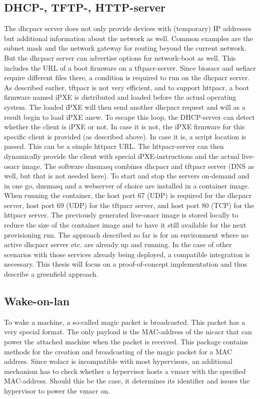 \subsection{DHCP-, TFTP-, HTTP-server}
The \gls{dhcpacr} server does not only provide devices with (temporary) IP addresses but additional information about the network as well. Common examples are the subnet mask and the network gateway for routing beyond the current network. But the \gls{dhcpacr} server can advertise options for network-boot as well. This includes the URL of a boot firmware on a \gls{tftpacr}-server. Since \gls{biosacr} and \gls{uefiacr} require different files there, a condition is required to run on the \gls{dhcpacr} server. As described earlier, \gls{tftpacr} is not very efficient, and to support \gls{httpacr}, a boot firmware named iPXE is distributed and loaded before the actual operating system. The loaded iPXE will then send another \gls{dhcpacr} request and will as a result begin to load iPXE anew. To escape this loop, the DHCP-server can detect whether the client is iPXE or not. In case it is not, the iPXE firmware for this specific client is provided (as described above). In case it is, a script location is passed. This can be a simple \gls{httpacr} URL. The \gls{httpacr}-server can then dynamically provide the client with special iPXE-instructions and the actual live-\gls{osacr} image.
\newline
The software dnsmasq combines \gls{dhcpacr} and \gls{tftpacr} server (DNS as well, but that is not needed here). To start and stop the servers on-demand and in one go, dnsmasq and a webserver of choice are installed in a container image. When running the container, the host port 67 (UDP) is required for the \gls{dhcpacr} server, host port 69 (UDP) for the \gls{tftpacr} server, and host port 80 (TCP) for the \gls{httpacr} server. The previously generated live-\gls{osacr} image is stored locally to reduce the size of the container image and to have it still available for the next provisioning run.
\newline
The approach described so far is for an environment where no active \gls{dhcpacr} server etc. are already up and running. In the case of other scenarios with those services already being deployed, a compatible integration is necessary. This thesis will focus on a proof-of-concept implementation and thus describe a greenfield approach.

\subsection{Wake-on-lan}
To wake a machine, a so-called magic packet is broadcasted. This packet has a very special format. The only  payload is the MAC-address of the \gls{nicacr} that can power the attached machine when the packet is received.
\newline
This package contains methods for the creation and broadcasting of the magic packet for a MAC address. Since \gls{wolacr} is incompatible with most hypervisors, an additional mechanism has to check whether a hypervisor hosts a \gls{vmacr} with the specified MAC-address. Should this be the case, it determines its identifier and issues the hypervisor to power the \gls{vmacr} on.

